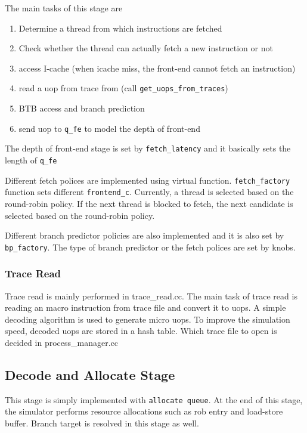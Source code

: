 The main tasks of this stage are 
\begin{enumerate}
\item Determine a thread from which instructions are fetched 
\item Check whether the thread can actually fetch a new instruction or not  
\item access I-cache  (when icache miss, the front-end cannot fetch an instruction) 
\item read a uop from trace from (call {\tt get\_uops\_from\_traces})
\item BTB access and branch prediction 
\item send uop to {\tt q\_fe} to model the depth of front-end 
\end{enumerate}
The depth of front-end stage is set by {\tt fetch\_latency} and it basically sets the length of 
{\tt q\_fe  }

Different fetch polices are implemented using virtual function. {\tt fetch\_factory} function sets 
different {\tt frontend\_c}. Currently, a thread is selected based on the round-robin policy. If the next thread is blocked to fetch, the next candidate is selected based on the round-robin policy. 

 Different branch predictor policies are also implemented and it is also set by {\tt bp\_factory}. The type of branch predictor or the fetch polices are set by knobs. 



\subsubsection{Trace Read} 
Trace read is mainly performed in trace\_read.cc. 
The main task of trace read is reading an macro instruction from trace file and convert it to uops. 
A simple decoding algorithm is used to generate micro uops. 
To improve the simulation speed, decoded uops are stored in a hash table. 
Which trace file to open is decided in process\_manager.cc 



\subsection{Decode and  Allocate Stage }
This stage is simply implemented with {\tt  allocate queue}.
At the end of this stage,  the simulator performs resource allocations such as rob entry and load-store buffer. 
Branch target is resolved in this stage as well. 

